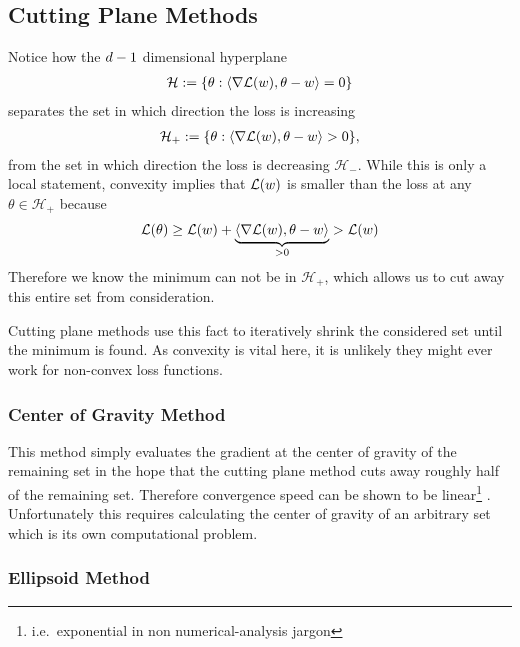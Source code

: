 \subsection{Cutting Plane Methods}

Notice how the \(d-1\) dimensional hyperplane
\begin{align*}
	\mathcal{H}
	:= \{\theta : \langle \nabla\mathcal{L}(w), \theta - w \rangle = 0\}
\end{align*}
separates the set in which direction the loss is increasing
\begin{align*}
	\mathcal{H}_+
	:= \{\theta : \langle \nabla\mathcal{L}(w), \theta - w \rangle > 0\},
\end{align*}
from the set in which direction the loss is decreasing \(\mathcal{H}_-\). While
this is only a local statement, convexity implies that \(\mathcal{L}(w)\) is
smaller than the loss at any \(\theta\in\mathcal{H}_+\) because
\begin{align*}
	\mathcal{L}(\theta)
	\ge \mathcal{L}(w) + \underbrace{\langle \nabla\mathcal{L}(w), \theta -w\rangle}_{>0}
	> \mathcal{L}(w)
\end{align*}
Therefore we know the minimum can not be in \(\mathcal{H}_+\), which allows us
to cut away this entire set from consideration.

Cutting plane methods use this fact to iteratively shrink the considered set
until the minimum is found. As convexity is vital here, it is unlikely they
might ever work for non-convex loss functions.

\subsubsection{Center of Gravity Method}

This method simply evaluates the gradient at the center of gravity of the
remaining set in the hope that the cutting plane method cuts away roughly half
of the remaining set. Therefore convergence speed can be shown to be
linear\footnote{i.e.\ exponential in non numerical-analysis jargon} 
\parencite[e.g.][Theorem 2.1]{bubeckConvexOptimizationAlgorithms2015}.
Unfortunately this requires calculating the center of gravity of an arbitrary
set which is its own computational problem. 

\subsubsection{Ellipsoid Method}


